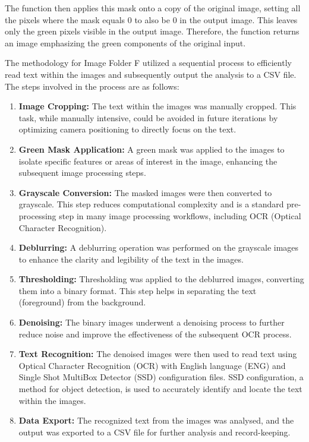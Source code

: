 The function then applies this mask onto a copy of the original image, setting all the pixels where the mask equals 0 to also be 0 in the output image. This leaves only the green pixels visible in the output image. Therefore, the function returns an image emphasizing the green components of the original input.

The methodology for Image Folder F utilized a sequential process to efficiently read text within the images and subsequently output the analysis to a CSV file. The steps involved in the process are as follows:

\begin{enumerate}
    \item \textbf{Image Cropping:} The text within the images was manually cropped. This task, while manually intensive, could be avoided in future iterations by optimizing camera positioning to directly focus on the text.

    \item \textbf{Green Mask Application:} A green mask was applied to the images to isolate specific features or areas of interest in the image, enhancing the subsequent image processing steps.

    \item \textbf{Grayscale Conversion:} The masked images were then converted to grayscale. This step reduces computational complexity and is a standard pre-processing step in many image processing workflows, including OCR (Optical Character Recognition).

    \item \textbf{Deblurring:} A deblurring operation was performed on the grayscale images to enhance the clarity and legibility of the text in the images.

    \item \textbf{Thresholding:} Thresholding was applied to the deblurred images, converting them into a binary format. This step helps in separating the text (foreground) from the background.

    \item \textbf{Denoising:} The binary images underwent a denoising process to further reduce noise and improve the effectiveness of the subsequent OCR process.

    \item \textbf{Text Recognition:} The denoised images were then used to read text using Optical Character Recognition (OCR) with English language (ENG) and Single Shot MultiBox Detector (SSD) configuration files. SSD configuration, a method for object detection, is used to accurately identify and locate the text within the images.

    \item \textbf{Data Export:} The recognized text from the images was analysed, and the output was exported to a CSV file for further analysis and record-keeping.
\end{enumerate}

